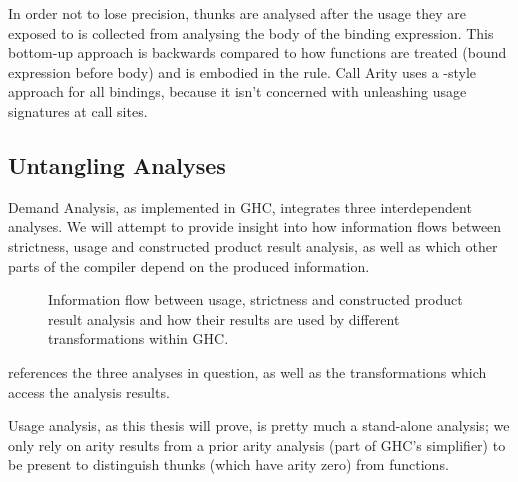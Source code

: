 In order not to lose precision, thunks are analysed after the usage they are exposed to is collected from analysing the body of the binding  expression.
This bottom-up approach is backwards compared to how functions are treated (\eg bound expression before body) and is embodied in the  rule.
Call Arity uses a -style approach for all bindings, because it isn't concerned with unleashing usage signatures at call sites.

\subsection{Untangling Analyses}\label{sec:untangle}

Demand Analysis, as implemented in GHC, integrates three interdependent analyses.
We will attempt to provide insight into how information flows between strictness, usage and constructed product result analysis, as well as which other parts of the compiler depend on the produced information.

\begin{figure}[h]
  \centering
  \caption{Information flow between usage, strictness and constructed product result analysis and how their results are used by different transformations within GHC.}
  \label{fig:dmd}
\end{figure}

 references the three analyses in question, as well as the transformations which access the analysis results.

Usage analysis, as this thesis will prove, is pretty much a stand-alone analysis; we only rely on arity results from a prior arity analysis (part of GHC's simplifier) to be present to distinguish thunks (which have arity zero) from functions.

